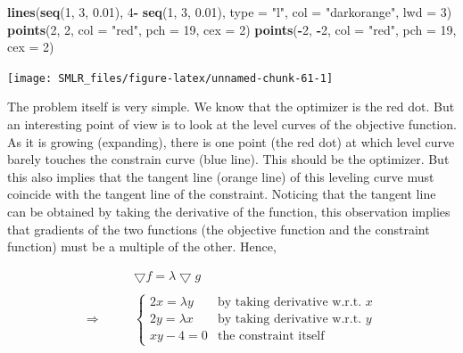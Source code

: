\documentclass[
]{book}
\newenvironment{Shaded}{\begin{snugshade}}{\end{snugshade}}
\newcommand{\AttributeTok}[1]{\textcolor[rgb]{0.13,0.29,0.53}{#1}}
\newcommand{\DecValTok}[1]{\textcolor[rgb]{0.00,0.00,0.81}{#1}}
\newcommand{\FloatTok}[1]{\textcolor[rgb]{0.00,0.00,0.81}{#1}}
\newcommand{\FunctionTok}[1]{\textcolor[rgb]{0.13,0.29,0.53}{\textbf{#1}}}
\newcommand{\NormalTok}[1]{#1}
\newcommand{\SpecialCharTok}[1]{\textcolor[rgb]{0.81,0.36,0.00}{\textbf{#1}}}
\newcommand{\StringTok}[1]{\textcolor[rgb]{0.31,0.60,0.02}{#1}}
\theoremstyle{definition}
\theoremstyle{definition}
\theoremstyle{definition}
\theoremstyle{definition}
\theoremstyle{remark}
\begin{document}
\begin{Shaded}
\begin{Highlighting}[]
  \FunctionTok{lines}\NormalTok{(}\FunctionTok{seq}\NormalTok{(}\DecValTok{1}\NormalTok{, }\DecValTok{3}\NormalTok{, }\FloatTok{0.01}\NormalTok{), }\DecValTok{4}\SpecialCharTok{{-}} \FunctionTok{seq}\NormalTok{(}\DecValTok{1}\NormalTok{, }\DecValTok{3}\NormalTok{, }\FloatTok{0.01}\NormalTok{), }\AttributeTok{type =} \StringTok{"l"}\NormalTok{, }\AttributeTok{col =} \StringTok{"darkorange"}\NormalTok{, }\AttributeTok{lwd =} \DecValTok{3}\NormalTok{)    }
  \FunctionTok{points}\NormalTok{(}\DecValTok{2}\NormalTok{, }\DecValTok{2}\NormalTok{, }\AttributeTok{col =} \StringTok{"red"}\NormalTok{, }\AttributeTok{pch =} \DecValTok{19}\NormalTok{, }\AttributeTok{cex =} \DecValTok{2}\NormalTok{)}
  \FunctionTok{points}\NormalTok{(}\SpecialCharTok{{-}}\DecValTok{2}\NormalTok{, }\SpecialCharTok{{-}}\DecValTok{2}\NormalTok{, }\AttributeTok{col =} \StringTok{"red"}\NormalTok{, }\AttributeTok{pch =} \DecValTok{19}\NormalTok{, }\AttributeTok{cex =} \DecValTok{2}\NormalTok{)}
\end{Highlighting}
\end{Shaded}

\begin{center}\texttt{[image: SMLR\_files/figure-latex/unnamed-chunk-61-1]} \end{center}

The problem itself is very simple. We know that the optimizer is the red dot. But an interesting point of view is to look at the level curves of the objective function. As it is growing (expanding), there is one point (the red dot) at which level curve barely touches the constrain curve (blue line). This should be the optimizer. But this also implies that the tangent line (orange line) of this leveling curve must coincide with the tangent line of the constraint. Noticing that the tangent line can be obtained by taking the derivative of the function, this observation implies that gradients of the two functions (the objective function and the constraint function) must be a multiple of the other. Hence,

\[ 
\begin{align}
& \bigtriangledown f = \lambda \bigtriangledown g \\
\\
\Longrightarrow \qquad &  \begin{cases}
    2x = \lambda y & \text{by taking derivative w.r.t.} \,\, x\\
    2y = \lambda x & \text{by taking derivative w.r.t.} \,\, y\\
    xy - 4 = 0 & \text{the constraint itself}
  \end{cases}
\end{align}
\]
\end{document}
